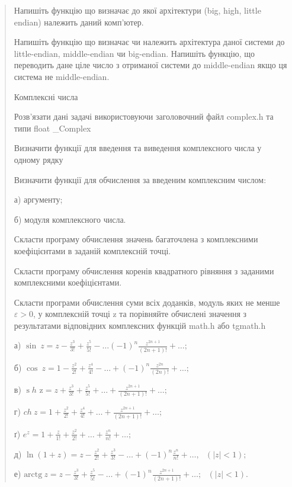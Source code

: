 \documentclass[]{article}
\begin{document}
\begin{quote}
Напишіть функцію що визначає до якої архітектури (big, high, little
endian) належить даний комп'ютер.

Напишіть функцію що визначає чи належить архітектура даної системи до
little-endian, middle-endian чи big-endian. Напишіть функцію, що
переводить дане ціле число з отриманої системи до middle-endian якщо ця
система не middle-endian.

Комплексні числа

\protect\hypertarget{_Hlk63616136}{}{}Розв'язати дані задачі
використовуючи заголовочний файл complex.h та типи float \_Complex

Визначити функції для введення та виведення комплексного числа у одному
рядку

Визначити функції для обчислення за введеним комплексним числом:

а) аргументу;

б) модуля комплексного числа.

Скласти програму обчислення значень багаточлена з комплексними
коефіцієнтами в заданій комплексній точці.

Скласти програму обчислення коренів квадратного рівняння з заданими
комплексними коефіцієнтами.

Скласти програми обчислення суми всіх доданків, модуль яких не менше 
$\varepsilon > 0$, у комплексній точці z та порівняйте обчислені значення
з результатами відповідних комплексних функцій math.h або tgmath.h

а)
\(\sin\ z = z - \frac{z^{3}}{3!} + \frac{z^{5}}{5!} - \ldots( - 1)^{n}\frac{z^{2n + 1}}{(2n + 1)!} + \ldots;\)

б)
\(\cos\ z = 1 - \frac{z^{2}}{2!} + \frac{z^{4}}{4!} - \ldots + ( - 1)^{n}\frac{z^{2n}}{(2n)!} + \ldots;\)

в)
\(\operatorname{s}h\mathrm{\text{\ z}} = z + \frac{z^{3}}{3!} + \frac{z^{5}}{5!} + \ldots + \frac{z^{2n + 1}}{(2n + 1)!} + \ldots;\)

г)
\(ch\ z = 1 + \frac{z^{2}}{2!} + \frac{z^{4}}{4!} + \ldots + \frac{z^{2n + 1}}{(2n + 1)!} + \ldots;\)

ґ)
\(e^{z} = 1 + \frac{z}{1!} + \frac{z^{2}}{2!} + \ldots + \frac{z^{n}}{n!} + \ldots;\)

д)
\(\ln(1 + z) = z - \frac{z^{2}}{2!} + \frac{z^{3}}{3!} - \ldots + ( - 1)^{n}\frac{z^{n}}{n!} + \ldots,\mathrm{\text{\ \ \ \ \ }}(\left| z \right| < 1);\)

е)
\(\mathrm{\text{arctg}}\mathrm{\ }z = z - \frac{z^{3}}{3!} + \frac{z^{5}}{5!} - \ldots + ( - 1)^{n}\frac{z^{2n + 1}}{\left( 2n + 1 \right)!} + \ldots;\mathrm{\text{\ \ \ }}\left( \left| z \right| < 1 \right).\)


\end{quote}
\end{document}
